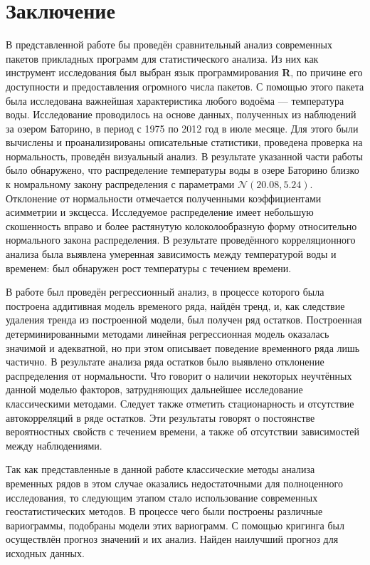 \chapter*{Заключение}

В представленной работе бы проведён сравнительный анализ современных пакетов прикладных программ для статистического анализа. Из них как инструмент исследования был выбран язык программирования \textbf{R}, по причине его доступности и предоставления огромного числа пакетов. С помощью этого пакета была исследована важнейшая характеристика любого водоёма --- температура воды. Исследование проводилось на основе данных, полученных из наблюдений за озером Баторино, в период с 1975 по 2012 год в июле месяце. Для этого были вычислены и проанализированы описательные статистики, проведена проверка на нормальность, проведён визуальный анализ. В результате указанной части работы было обнаружено, что распределение температуры воды в озере Баторино близко к номральному закону распределения с параметрами $\mathcal{N}(20.08, 5.24)$. Отклонение от нормальности отмечается полученными коэффициентами асимметрии и эксцесса. Исследуемое распределение имеет небольшую скошенность вправо и более растянутую колоколообразную форму относительно нормального закона распределения. В результате проведённого корреляционного анализа была выявлена умеренная зависимость между температурой воды и временем: был обнаружен рост температуры с течением времени.

В работе был проведён регрессионный анализ, в процессе которого была построена аддитивная модель временого ряда, найдён тренд, и, как следствие удаления тренда из построенной модели, был получен ряд остатков. Построенная детерминированными методами линейная регрессионная модель оказалась значимой и адекватной, но при этом описывает поведение временного ряда лишь частично. В результате анализа ряда остатков было выявлено отклонение распределения от нормальности. Что говорит о наличии некоторых неучтённых данной моделью факторов, затрудняющих дальнейшее исследование классическими методами. Следует также отметить стационарность и отсутствие автокорреляций в ряде остатков. Эти результаты говорят о постоянстве вероятностных свойств с течением времени, а также об отсутствии зависимостей между наблюдениями.

Так как представленные в данной работе классические методы анализа временных рядов в этом случае оказались недостаточными для полноценного исследования, то следующим этапом стало использование современных геостатистических методов. В процессе чего были построены различные вариограммы, подобраны модели этих вариограмм. С помощью кригинга был осуществлён прогноз значений и их анализ. Найден наилучший прогноз для исходных данных.